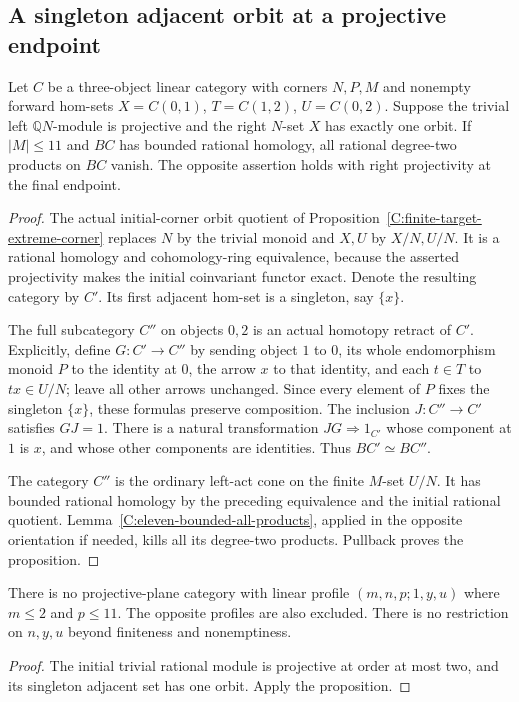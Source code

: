 \subsection{A singleton adjacent orbit at a projective endpoint}

\begin{proposition}\label{C:projective-initial-singleton-middle}
Let $C$ be a three-object linear category with corners $N,P,M$
and nonempty forward hom-sets $X=C(0,1)$, $T=C(1,2)$,
$U=C(0,2)$. Suppose the trivial left $\mathbb QN$-module
is projective and the right $N$-set $X$ has exactly one orbit.
If $|M|\leq11$ and $BC$ has bounded rational homology, all
rational degree-two products on $BC$ vanish. The opposite
assertion holds with right projectivity at the final endpoint.
\end{proposition}
\begin{proof}
The actual initial-corner orbit quotient of
Proposition~\ref{C:finite-target-extreme-corner} replaces $N$
by the trivial monoid and $X,U$ by $X/N,U/N$.
It is a rational homology and cohomology-ring equivalence,
because the asserted projectivity makes the initial
coinvariant functor exact. Denote the resulting category by
$C'$. Its first adjacent hom-set is a singleton, say $\{x\}$.

The full subcategory $C''$ on objects $0,2$ is an actual
homotopy retract of $C'$. Explicitly, define $G:C'\to C''$
by sending object $1$ to $0$, its whole endomorphism monoid
$P$ to the identity at $0$, the arrow $x$ to that identity,
and each $t\in T$ to $tx\in U/N$; leave all other arrows
unchanged. Since every element of $P$ fixes the singleton
$\{x\}$, these formulas preserve composition. The inclusion
$J:C''\to C'$ satisfies $GJ=1$. There is a natural
transformation $JG\Rightarrow1_{C'}$ whose component at
$1$ is $x$, and whose other components are identities.
Thus $BC'\simeq BC''$.

The category $C''$ is the ordinary left-act cone on the
finite $M$-set $U/N$. It has bounded rational homology by
the preceding equivalence and the initial rational quotient.
Lemma~\ref{C:eleven-bounded-all-products}, applied in the
opposite orientation if needed, kills all its degree-two
products. Pullback proves the proposition.
\end{proof}

\begin{corollary}\label{C:small-projective-initial-singleton}
There is no projective-plane category with linear profile
$(m,n,p;1,y,u)$ where $m\leq2$ and $p\leq11$.
The opposite profiles are also excluded. There is no
restriction on $n,y,u$ beyond finiteness and nonemptiness.
\end{corollary}
\begin{proof}
The initial trivial rational module is projective at order
at most two, and its singleton adjacent set has one orbit.
Apply the proposition.
\end{proof}
